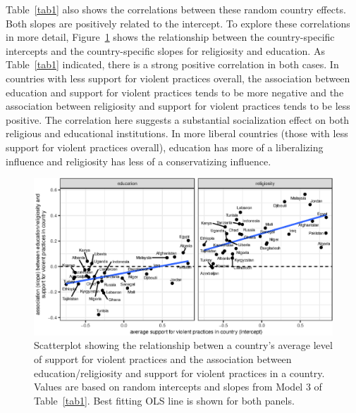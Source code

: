 \documentclass[10pt,letterpaper]{article}
\begin{document}
Table~\ref{tab1} also shows the correlations between these random country
effects. Both slopes are positively related to the intercept. To explore
these correlations in more detail, Figure~\ref{fig4} shows the relationship
between the country-specific intercepts and the country-specific slopes
for religiosity and education. As Table~\ref{tab1} indicated, there is a strong
positive correlation in both cases. In countries with less support for
violent practices overall, the association between education and support
for violent practices tends to be more negative and the association
between religiosity and support for violent practices tends to be less
positive. The correlation here suggests a substantial socialization
effect on both religious and educational institutions. In more liberal
countries (those with less support for violent practices overall),
education has more of a liberalizing influence and religiosity has less
of a conservatizing influence.

\begin{figure}[!h]
\begin{adjustwidth}{-2.25in}{0in}
\centering
\includegraphics{figures/fig4.eps}
\caption{Scatterplot showing the relationship betwen a country's average
level of support for violent practices and the association between
education/religiosity and support for violent practices in a country.
Values are based on random intercepts and slopes from Model 3 of Table~\ref{tab1}. Best fitting OLS line is shown for both panels.}
\label{fig4}
\end{adjustwidth}
\end{figure}
\end{document}
